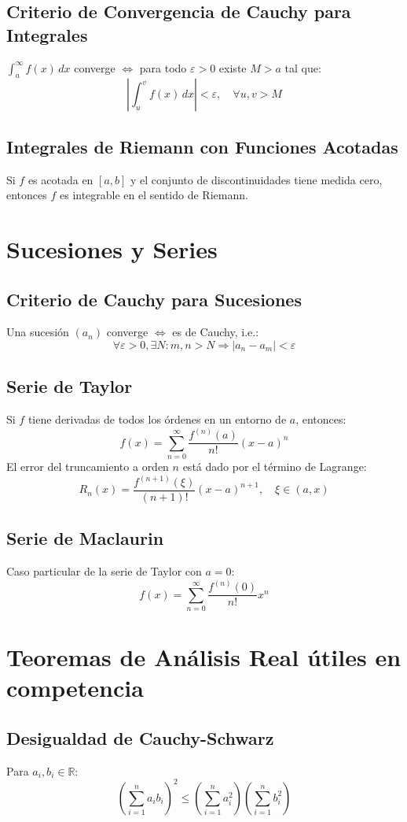 \documentclass[12pt]{article}
\begin{document}
\subsection{Criterio de Convergencia de Cauchy para Integrales}
$\int_a^\infty f(x)\,dx$ converge $\Leftrightarrow$ para todo $\varepsilon > 0$ existe $M > a$ tal que:
\[
\left| \int_u^v f(x)\,dx \right| < \varepsilon,\quad \forall u,v > M
\]

\subsection{Integrales de Riemann con Funciones Acotadas}
Si $f$ es acotada en $[a,b]$ y el conjunto de discontinuidades tiene medida cero, entonces $f$ es integrable en el sentido de Riemann.

\section{Sucesiones y Series}

\subsection{Criterio de Cauchy para Sucesiones}
Una sucesión $(a_n)$ converge $\Leftrightarrow$ es de Cauchy, i.e.:
\[
\forall \varepsilon > 0, \exists N: m,n > N \Rightarrow |a_n - a_m| < \varepsilon
\]

\subsection{Serie de Taylor}
Si $f$ tiene derivadas de todos los órdenes en un entorno de $a$, entonces:
\[
f(x) = \sum_{n=0}^\infty \frac{f^{(n)}(a)}{n!}(x - a)^n
\]
El error del truncamiento a orden $n$ está dado por el término de Lagrange:
\[
R_n(x) = \frac{f^{(n+1)}(\xi)}{(n+1)!}(x - a)^{n+1},\quad \xi \in (a,x)
\]

\subsection{Serie de Maclaurin}
Caso particular de la serie de Taylor con $a = 0$:
\[
f(x) = \sum_{n=0}^\infty \frac{f^{(n)}(0)}{n!}x^n
\]

\section{Teoremas de Análisis Real útiles en competencia}

\subsection{Desigualdad de Cauchy-Schwarz}
Para $a_i, b_i \in \mathbb{R}$:
\[
\left( \sum_{i=1}^n a_i b_i \right)^2 \leq \left( \sum_{i=1}^n a_i^2 \right)\left( \sum_{i=1}^n b_i^2 \right)
\]
\end{document}
